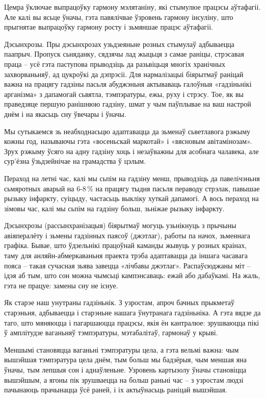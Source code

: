 Цемра ўключае выпрацоўку гармону мэлятаніну, які стымулюе працэсы аўтафагіі. Але калі вы ясьце ўначы, гэта павялічвае ўзровень гармону інсуліну, што прыгнятае выпрацоўку гармону росту і зьмяншае працэс аўтафагіі.

Дэсынхрозы. Пры дэсынхрозах узьдзеяньне розных стымулаў адбываецца паапрыч. Пропуск сьняданку, сядзячы лад жыцьця з самае раніцы, стрэсавая праца – усё гэта паступова прыводзіць да разьвіцьця многіх хранічных захворваньняў, ад цукроўкі да дэпрэсіі. Для нармалізацыі біярытмаў раніцай важна на працягу гадзіны пасьля абуджэньня актываваць галоўныя «гадзіньнікі арганізма» з дапамогай сьвятла, тэмпэратуры, ежы, руху і стрэсу. Тое, як вы праведзяце першую ранішнюю гадзіну, шмат у чым паўплывае на ваш настрой днём і на якасьць сну ўвечары і ўначы.

Мы сутыкаемся зь неабходнасьцю адаптавацца да зьменаў сьветлавога рэжыму кожны год, называючы гэта «восеньскай маркотай» і «вясновым авітамінозам». Зрух рэжыму ўсяго на адну гадзіну хоць і незаўважны для асобнага чалавека, але сур'ёзна ўзьдзейнічае на грамадства ў цэлым.

Пераход на летні час, калі мы сьпім на гадзіну менш, прыводзіць да павелічэньня сьмяротных аварый на 6-8\,\% на працягу тыдня пасьля пераводу стрэлак, павышае рызыку інфаркту, суіцыду, частасьць выкліку хуткай дапамогі. А вось пераход на зімовы час, калі мы сьпім на гадзіну больш, зьніжае рызыку інфаркту.

Дэсынхрозы (рассынхранізацыя) біярытмаў могуць узьнікнуць з прычыны авіяпералёту і зьмены гадзінных паясоў (джэтлаг), работы па начох, зьменнага графіка. Бывае, што ўдзельнікі працоўнай каманды жывуць у розных краінах, таму для анляйн-абмеркаваньня праекта трэба адаптавацца да іншага часавага пояса – такая сучасная зьява завецца «лічбавы джэтлаг». Распаўсюджаны міт – ідэя аб тым, што сон можна чымсьці кампэнсаваць: ежай або дабаўкамі. На жаль, гэта не працуе: замены сну не існуе.

Як старэе наш унутраны гадзіньнік. З узростам, апроч бачных прыкметаў старэньня, адбываецца і старэньне нашага ўнутранага гадзіньніка. А гэта вядзе да таго, што мяняюцца і пагаршаюцца працэсы, якія ён кантралюе: зрушваюцца пікі ў амплітудзе ваганьняў тэмпэратуры, мэтабалітаў, гармонаў у крыві.

Меншымі становяцца ваганьні тэмпэратуры цела, а гэта вельмі важна: чым вышэйшая тэмпэратура цела днём, тым больш мы бадзёрыя, чым меншая яна ўначы, тым лепшыя сон і аднаўленьне. Узровень картызолу ўначы становіцца вышэйшым, а ягоны пік зрушваецца на больш раньні час – з узростам людзі пачынаюць прачынацца ўсё раней, і іх актыўнасьць раніцай вышэйшая.

